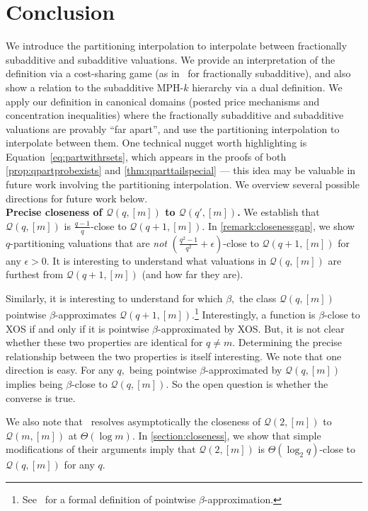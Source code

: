 \documentclass[11pt]{article}\usepackage{amsfonts}
\numberwithin{theorem}{subsection}
\begin{document}
\section{Conclusion}
\label{section:futurework}
We introduce the partitioning interpolation to interpolate between fractionally subadditive and subadditive valuations. We provide an interpretation of the definition via a cost-sharing game (as in~\cite{Bondareva63,Shapley67} for fractionally subadditive), and also show a relation to the subadditive MPH-$k$ hierarchy via a dual definition. We apply our definition in canonical domains (posted price mechanisms and concentration inequalities) where the fractionally subadditive and subadditive valuations are provably ``far apart'', and use the partitioning interpolation to interpolate between them. One technical nugget worth highlighting is Equation~\eqref{eq:partwithrsets}, which appears in the proofs of both \cref{prop:qpartprobexists} and \cref{thm:qparttailspecial} --- this idea may be valuable in future work involving the partitioning interpolation. We overview several possible directions for future work below.\\

\noindent\textbf{Precise closeness of $\mathcal{Q}(q,[m])$ to $\mathcal{Q}(q',[m])$.} We establish that $\mathcal{Q}(q,[m])$ is $\frac{q-1}{q}$-close to $\mathcal{Q}(q+1,[m])$. In \cref{remark:closenessgap}, we show $q$-partitioning valuations that are \emph{not} $\left(\frac{q^2-1}{q^2}+\epsilon\right)$-close to $\mathcal{Q}(q+1,[m])$ for any $\epsilon>0.$ It is interesting to understand what valuations in $\mathcal{Q}(q,[m])$ are furthest from $\mathcal{Q}(q+1,[m])$ (and how far they are). 

Similarly, it is interesting to understand for which $\beta,$ the class $\mathcal{Q}(q,[m])$ pointwise $\beta$-approximates $\mathcal{Q}(q+1,[m])$.\footnote{See~\cite{DevanurMSW15} for a formal definition of pointwise $\beta$-approximation.} Interestingly, a function is $\beta$-close to XOS if and only if it is pointwise $\beta$-approximated by XOS. But, it is not clear whether these two properties are identical for $q\neq m.$ Determining the precise relationship between the two properties is itself interesting. We note that one direction is easy. For any $q,$ being pointwise $\beta$-approximated by $\mathcal{Q}(q,[m])$ implies being $\beta$-close to $\mathcal{Q}(q,[m])$. So the open question is whether the converse is true.

We also note that~\cite{BhawalkarR11} resolves asymptotically the closeness of $\mathcal{Q}(2,[m])$ to $\mathcal{Q}(m,[m])$ at $\Theta(\log m)$. In \cref{section:closeness}, we show that simple modifications of their arguments imply that $\mathcal{Q}(2,[m])$ is $\Theta(\log_2 q)$-close to $\mathcal{Q}(q,[m])$ for any $q$.\\
\end{document}
